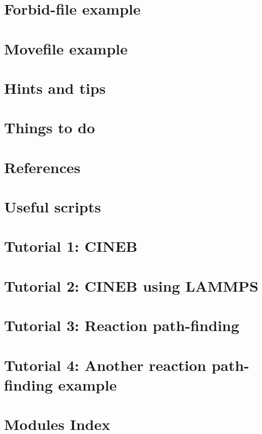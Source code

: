\let\mypdfximage\pdfximage\def\pdfximage{\immediate\mypdfximage}\documentclass[twoside]{book}
\newcommand{\+}{\discretionary{\mbox{\scriptsize$\hookleftarrow$}}{}{}}
\begin{document}
\chapter{Forbid-\/file example}
\label{forbid}

\chapter{Movefile example}
\label{moves}

\chapter{Hints and tips}
\label{hints}

\chapter{Things to do}
\label{todo}

\chapter{References}
\label{_references}

\chapter{Useful scripts}
\label{scripts}

\chapter{Tutorial 1\+: C\+I\+N\+EB}
\label{_tutorial1}

\chapter{Tutorial 2\+: C\+I\+N\+EB using L\+A\+M\+M\+PS}
\label{_tutorial2}

\chapter{Tutorial 3\+: Reaction path-\/finding}
\label{pathfind}

\chapter{Tutorial 4\+: Another reaction path-\/finding example}
\label{pathfind2}

\chapter{Modules Index}

\end{document}
